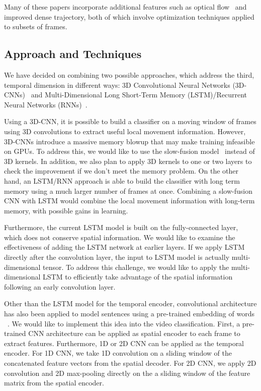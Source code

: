 Many of these papers incorporate additional features such as optical flow~\cite{brox} and improved dense trajectory, both of which involve optimization techniques applied to subsets of frames. 
\subsection*{Approach and Techniques}
We have decided on combining two possible approaches, which address
the third, temporal dimension in different ways: 3D Convolutional Neural
Networks (3D-CNNs)~\cite{stf,cnnvid} and Multi-Dimensional Long
Short-Term Memory (LSTM)/Recurrent Neural Networks (RNNs)~\cite{ltrcn}. 

Using a 3D-CNN, it is possible to build a classifier on a moving window
of frames using 3D convolutions to extract useful local movement information. However, 3D-CNNs introduce a massive memory blowup that may make training infeasible on GPUs.
To address this, we would like to use the slow-fusion model~\cite{cnnvid} instead of 3D kernels. In addition, we also plan to apply 3D kernels to one or two layers to check the improvement if we don't meet the memory problem. On the other hand, an LSTM/RNN approach is able to build the classifier with long term memory using a much larger number of frames at once. Combining a slow-fusion CNN with LSTM would combine the local movement information with long-term memory, with possible gains in learning.


Furthermore, the current LSTM model is built on the fully-connected
layer, which does not conserve spatial information. We would like to examine the 
effectiveness of adding the LSTM network at earlier layers.
If we apply LSTM directly after the convolution layer,
the input to LSTM model is actually multi-dimensional tensor. To address
this challenge, we would like to apply the multi-dimensional LSTM
\cite{byeon2015scene} to efficiently take advantage of the spatial
information following an early convolution layer. 

Other than the LSTM model for the temporal encoder, convolutional architecture has also been applied to model sentences using a pre-trained embedding of words ~\cite{cnnSC,cnnMNLS}. We would like to implement this idea into the video classification. First, a pre-trained CNN architecture can be applied as spatial encoder to each frame to extract features. Furthermore, 1D or 2D CNN can be applied as the temporal encoder. For 1D CNN, we take 1D convolution on a sliding window of the concatenated feature vectors from the spatial decoder. For 2D CNN, we apply 2D convolution and 2D max-pooling directly on the a sliding window of the feature matrix from the spatial encoder. 

